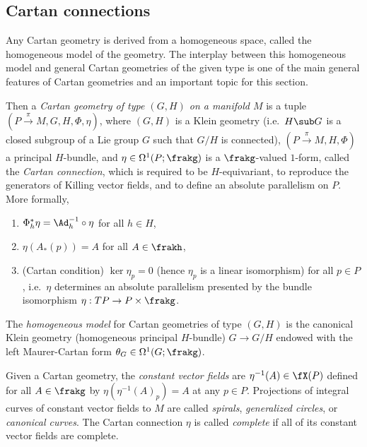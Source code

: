 \subsection{Cartan connections}

Any Cartan geometry is derived from a homogeneous space, called the homogeneous model of the geometry. The interplay between this homogeneous model and general Cartan geometries of the given type is one of the main general features of Cartan geometries and an important topic for this section.


\begin{defn}\label{def cartan geometry I}
    Then a \emph{Cartan geometry of type $(G,H)$ on a manifold $M$} is a tuple $(P\overset{\pi}{\to}M,G,H,\Phi,\eta)$, where $(G,H)$ is a Klein geometry (i.e.\ $H\sub G$ is a closed subgroup of a Lie group $G$ such that $G\slash H$ is connected),
    $(P\overset{\pi}{\to}M,H,\Phi)$ a principal $H$-bundle, and $\eta\in\Omega^1(P;\frakg)$ is a $\frakg$-valued $1$-form, called the \emph{Cartan connection}, which is required to be $H$-equivariant, to reproduce the generators of Killing vector fields, and to define an absolute parallelism on $P$. More formally,
    \begin{enumerate}
        \item $\Phi_h^\ast \eta=\Ad_h^{-1}\circ \eta$ for all $h\in H$,
        \item $\eta(A_\ast(p))=A$ for all $A\in\frakh$,
        \item (Cartan condition) $\ker\eta_p=0$ (hence $\eta_p$ is a linear isomorphism) for all $p\in P$, i.e.\ $\eta$ determines an absolute parallelism presented by the bundle isomorphism $\eta:TP\to P\times\frakg$.
    \end{enumerate}
    The \emph{homogeneous model} for Cartan geometries of type $(G,H)$ is the canonical Klein geometry (homogeneous principal $H$-bundle) $G\to G\slash H$ endowed with the left Maurer-Cartan form $\theta_G\in\Omega^1(G;\frakg)$.

    Given a Cartan geometry, the \emph{constant vector fields} are $\eta^{-1}(A)\in\fX(P)$ defined for all $A\in\frakg$ by $\eta(\eta^{-1}(A)_p)=A$ at any $p\in P$. Projections of integral curves of constant vector fields to $M$ are called \emph{spirals}, \emph{generalized circles}, or \emph{canonical curves}. The Cartan connection $\eta$ is called \emph{complete} if all of its constant vector fields are complete.
\end{defn}

